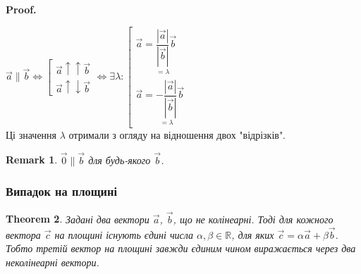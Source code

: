 \documentclass[a4paper, 10pt]{extarticle}
\makeatletter
\def\qed{$\blacksquare$}
\def\qed{$\blacksquare$}
\theoremstyle{theoremdd}
\newtheorem{theorem}{Theorem}[subsection]
\theoremstyle{theoremdd}
\theoremstyle{theoremdd}
\theoremstyle{theoremdd}
\theoremstyle{theoremdd}
\theoremstyle{theoremdd}
\newtheorem{remark}[theorem]{Remark}
\theoremstyle{theoremdd}
\theoremstyle{theoremdd}
\renewenvironment{proof}[1][Proof.\\]{\par
\pushQED{\hfill \qed}%
\normalfont \topsep6\p@\@plus6\p@\relax
\trivlist
\item\relax
{\bfseries
#1\@addpunct{.}}\hspace\labelsep\ignorespaces
}{%
\popQED\endtrivlist\@endpefalse
}
\makeatother
\begin{document}
\begin{proof}
$\vec{a} \parallel \vec{b} \iff \left[ \begin{gathered} \vec{a} \uparrow \uparrow \vec{b} \\ \vec{a} \uparrow \downarrow \vec{b} \end{gathered} \right. \iff \exists \lambda: \left[ \begin{gathered} \vec{a} = \underset{=\lambda}{\dfrac{|\vec{a}|}{|\vec{b}|}} \vec{b} \\ \vec{a} = \underset{=\lambda}{-\dfrac{|\vec{a}|}{|\vec{b}|}} \vec{b} \end{gathered} \right.$\\
Ці значення $\lambda$ отримали з огляду на відношення двох "відрізків".
\end{proof}

\begin{remark}
$\vec{0} \parallel \vec{b}$ для будь-якого $\vec{b}$.
\end{remark}

\subsubsection{Випадок на площині}
\begin{theorem}
\label{basis_on_plane}
Задані два вектори $\vec{a}$, $\vec{b}$, що не колінеарні. Тоді для кожного вектора $\vec{c}$ на площині існують єдині числа $\alpha, \beta \in \mathbb{R}$, для яких $\vec{c} = \alpha \vec{a} + \beta \vec{b}$.\\
Тобто третій вектор на площині завжди єдиним чином виражається через два неколінеарні вектори.
\end{theorem}
\end{document}

